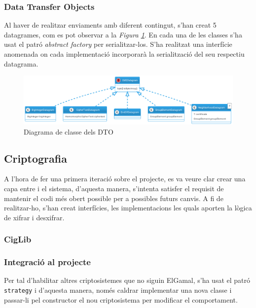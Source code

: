 \subsubsection{Data Transfer Objects}
Al haver de realitzar enviaments amb diferent contingut, s'han creat 5 datagrames, com es pot observar a la \textit{Figura \ref{fig:dto}}. En cada una de les classes s'ha usat el patró \textit{abstract factory} per serialitzar-los. S'ha realitzat una interfície anomenada \factoryDTO on cada implementació incorporarà la serialització del seu respectiu datagrama.
\begin{figure}[H]
	\includegraphics[width=15cm]{classes/dto.png}
	\caption{Diagrama de classe dels DTO}
	\label{fig:dto}
\end{figure}
\subsection{Criptografia}
A l'hora de fer una primera iteració sobre el projecte, es va veure clar crear una capa entre \ciglib i el sistema, d'aquesta manera, s'intenta satisfer el requisit de mantenir el codi més obert possible per a possibles futurs canvis. A fi de realitzar-ho, s'han creat interfícies, les implementacions les quals aporten la lògica de xifrar i desxifrar.
\subsubsection{CigLib}

\subsubsection{Integració al projecte}
 Per tal d'habilitar altres criptosistemes que no siguin ElGamal, s'ha usat el patró \texttt{strategy} i d'aquesta manera, només caldrar implementar una nova classe i passar-li pel constructor el nou criptosistema per modificar el comportament.
